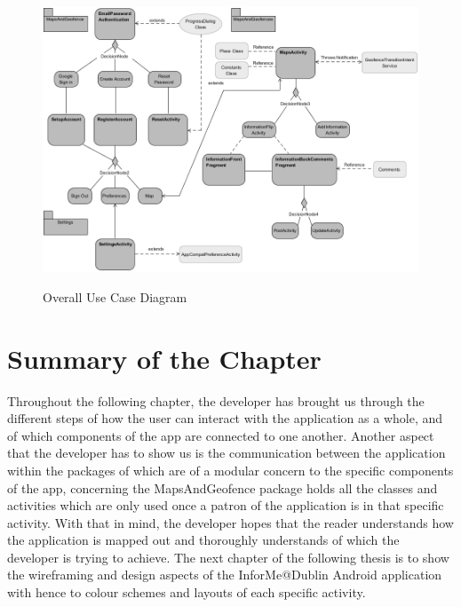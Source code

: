 \begin{figure}[htbp]
    \center \includegraphics[width=470pt]{FullActivity}\\
    \caption{Overall Use Case Diagram} \label{Figure: Overall Activity Diagram }
\end{figure}


\section{Summary of the Chapter}
Throughout the following chapter, the developer has brought us through the different steps of how the user can interact with the application as a whole, and of which components of the app are connected to one another. Another aspect that the developer has to show us is the communication between the application within the packages of which are of a modular concern to the specific components of the app, concerning the MapsAndGeofence package holds all the classes and activities which are only used once a patron of the application is in that specific activity. With that in mind, the developer hopes that the reader understands how the application is mapped out and thoroughly understands of which the developer is trying to achieve. The next chapter of the following thesis is to show the wireframing and design aspects of the InforMe@Dublin Android application with hence to colour schemes and layouts of each specific activity.
